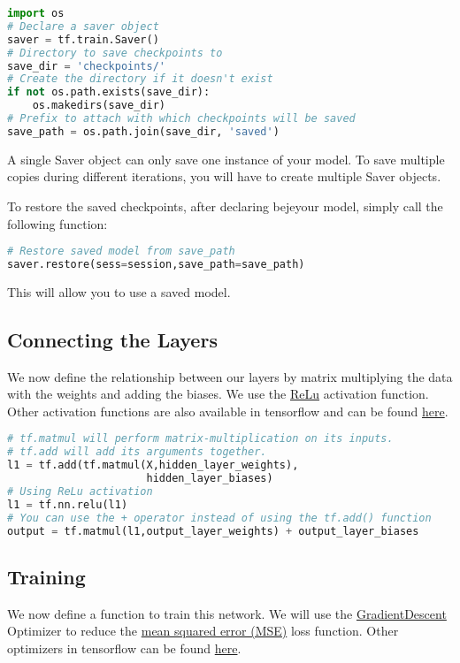 \documentclass[Proceedings]{ascelike}
\begin{document}
\begin{lstlisting}[language=Python]
import os
# Declare a saver object
saver = tf.train.Saver()
# Directory to save checkpoints to
save_dir = 'checkpoints/'
# Create the directory if it doesn't exist
if not os.path.exists(save_dir):
    os.makedirs(save_dir)
# Prefix to attach with which checkpoints will be saved
save_path = os.path.join(save_dir, 'saved')
\end{lstlisting}

A single Saver object can only save one instance of your model. To save multiple copies during different iterations, you will have to create multiple Saver objects.

To restore the saved checkpoints, after declaring bejeyour model, simply call the following function:

\begin{lstlisting}[language=Python]
# Restore saved model from save_path
saver.restore(sess=session,save_path=save_path)
\end{lstlisting}

This will allow you to use a saved model.


\subsection{Connecting the Layers}
We now define the relationship between our layers by matrix multiplying the data with the weights and adding the biases. We use the \href{https://en.wikipedia.org/wiki/Rectifier_(neural_networks)}{ReLu} activation function. Other activation functions are also available in tensorflow and can be found \href{https://www.tensorflow.org/api_guides/python/nn}{here}.

\begin{lstlisting}[language=Python]
# tf.matmul will perform matrix-multiplication on its inputs.
# tf.add will add its arguments together.
l1 = tf.add(tf.matmul(X,hidden_layer_weights), 
                      hidden_layer_biases)
# Using ReLu activation
l1 = tf.nn.relu(l1)
# You can use the + operator instead of using the tf.add() function
output = tf.matmul(l1,output_layer_weights) + output_layer_biases
\end{lstlisting}

\subsection{Training}
We now define a function to train this network. We will use the \href{https://en.wikipedia.org/wiki/Gradient_descent}{GradientDescent} Optimizer to reduce the \href{https://en.wikipedia.org/wiki/Mean_squared_error}{mean squared error (MSE)} loss function. Other optimizers in tensorflow can be found \href{https://www.tensorflow.org/api_guides/python/train#Optimizers}{here}.
\end{document}
